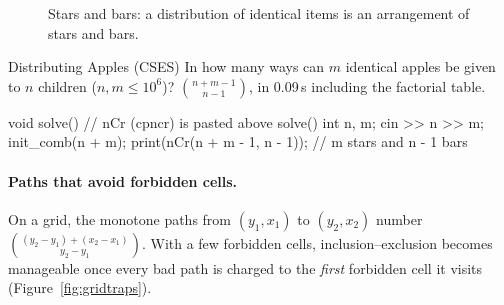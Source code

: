 \begin{figure}[htbp]
\centering
{}
\caption{Stars and bars: a distribution of identical items is an arrangement of stars and bars.}
\label{fig:starsbars}
\end{figure}

\begin{problem}{Distributing Apples (CSES)}
In how many ways can $m$ identical apples be given to $n$ children ($n, m \le 10^6$)?
\solution $\binom{n + m - 1}{n - 1}$, in 0.09\,s including the factorial table.
\end{problem}

\begin{code}
void solve() {  // nCr (cpncr) is pasted above solve()
    int n, m;
    cin >> n >> m;
    init_comb(n + m);
    print(nCr(n + m - 1, n - 1));  // m stars and n - 1 bars
}
\end{code}

\paragraph{Paths that avoid forbidden cells.} On a grid, the monotone paths from $(y_1, x_1)$ to $(y_2, x_2)$ number
$\binom{(y_2 - y_1) + (x_2 - x_1)}{y_2 - y_1}$. With a few forbidden cells, inclusion--exclusion becomes manageable once every bad path is
charged to the \emph{first} forbidden cell it visits (Figure~\ref{fig:gridtraps}).

